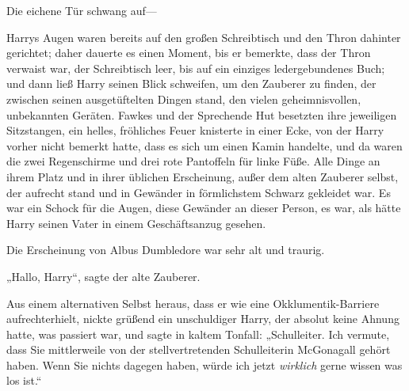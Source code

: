 Die eichene Tür schwang auf—

Harrys Augen waren bereits auf den großen Schreibtisch und den Thron dahinter gerichtet; daher dauerte es einen Moment, bis er bemerkte, dass der Thron verwaist war, der Schreibtisch leer, bis auf ein einziges ledergebundenes Buch; und dann ließ Harry seinen Blick schweifen, um den Zauberer zu finden, der zwischen seinen ausgetüftelten Dingen stand, den vielen geheimnisvollen, unbekannten Geräten. Fawkes und der Sprechende Hut besetzten ihre jeweiligen Sitzstangen, ein helles, fröhliches Feuer knisterte in einer Ecke, von der Harry vorher nicht bemerkt hatte, dass es sich um einen Kamin handelte, und da waren die zwei Regenschirme und drei rote Pantoffeln für linke Füße. Alle Dinge an ihrem Platz und in ihrer üblichen Erscheinung, außer dem alten Zauberer selbst, der aufrecht stand und in Gewänder in förmlichstem Schwarz gekleidet war. Es war ein Schock für die Augen, diese Gewänder an dieser Person, es war, als hätte Harry seinen Vater in einem Geschäftsanzug gesehen.

Die Erscheinung von Albus Dumbledore war sehr alt und traurig.

„Hallo, Harry“, sagte der alte Zauberer.

Aus einem alternativen Selbst heraus, dass er wie eine Okklumentik-Barriere aufrechterhielt, nickte grüßend ein unschuldiger Harry, der absolut keine Ahnung hatte, was passiert war, und sagte in kaltem Tonfall:
„Schulleiter. Ich vermute, dass Sie mittlerweile von der stellvertretenden Schulleiterin McGonagall gehört haben. Wenn Sie nichts dagegen haben, würde ich jetzt \emph{wirklich} gerne wissen was los ist.“

